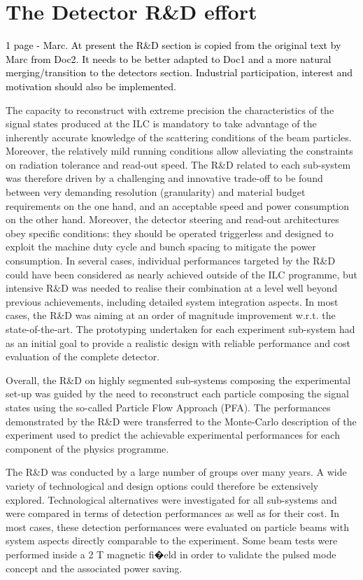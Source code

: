 \documentclass[%
 reprint,
 amsmath,amssymb,
 aps,
]{revtex4-1}
\newcommand{\todo}[1]{\textcolor{black}{{#1}}}
\begin{document}
\section{\label{sec:detectrd} The Detector R\&D effort}


\todo{ 1 page - Marc.}
\todo{At present the R\&D section is copied from the original text by  Marc from Doc2. It needs to be better adapted to Doc1 and a more natural merging/transition to the detectors section. Industrial participation, interest and motivation should also be implemented.}


The capacity to reconstruct with extreme precision the characteristics of the signal states produced at the ILC is mandatory to take advantage of the inherently accurate knowledge of the scattering conditions of the beam particles. Moreover, the relatively mild running conditions allow alleviating the constraints on radiation tolerance and read-out speed. The R\&D related to each sub-system was therefore driven by a challenging and innovative trade-off to be found between very demanding resolution (granularity) and material budget requirements on the one hand, and an acceptable speed and power consumption on the other hand. Moreover, the detector steering and read-out architectures obey specific conditions: they should be operated triggerless and designed to exploit the machine duty cycle and bunch spacing to mitigate the power consumption.
In several cases, individual performances targeted by the R\&D could have been considered as nearly achieved outside of the ILC programme, but intensive R\&D was needed to realise their combination at a level well beyond previous achievements, including detailed system integration aspects. In most cases, the R\&D was aiming at an order of magnitude improvement w.r.t. the state-of-the-art. The prototyping undertaken for each experiment sub-system had as an initial goal to provide a realistic design with reliable performance and cost evaluation of the complete detector.

Overall, the R\&D on highly segmented sub-systems composing the experimental set-up was guided by the need to reconstruct each particle composing the signal states using the so-called Particle Flow Approach (PFA). The performances demonstrated by the R\&D were transferred to the Monte-Carlo description of the experiment used to predict the achievable experimental performances for each component of the physics programme.

The R\&D was conducted by a large number of groups over many years. A wide variety of technological and design options could therefore be extensively explored. Technological alternatives were investigated for all sub-systems and were compared in terms of detection performances as well as for their cost. In most cases, these detection performances were evaluated on particle beams with system aspects directly comparable to the experiment. Some beam tests were performed inside a 2 T magnetic fi�eld in order to validate the pulsed mode concept and the associated power saving.
\end{document}
